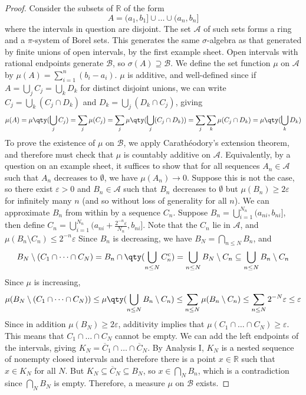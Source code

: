 \begin{proof}
	Consider the subsets of $\mathbb R$ of the form
	\[ A = (a_1,b_1] \cup \dots \cup (a_n,b_n] \]
	where the intervals in question are disjoint.
	The set $\mathcal A$ of such sets forms a ring and a $\pi$-system of Borel sets.
	This generates the same $\sigma$-algebra as that generated by finite unions of open intervals, by the first example sheet.
	Open intervals with rational endpoints generate $\mathcal B$, so $\sigma(A) \supseteq \mathcal B$.
	We define the set function $\mu$ on $\mathcal A$ by $\mu(A) = \sum_{i=1}^n (b_i - a_i)$.
	$\mu$ is additive, and well-defined since if $A = \bigcup_j C_j = \bigcup_k D_k$ for distinct disjoint unions, we can write $C_j = \bigcup_k (C_j \cap D_k)$ and $D_k = \bigcup_j (D_k \cap C_j)$, giving
	\[ \mu(A) = \mu\qty(\bigcup_j C_j) = \sum_j \mu(C_j) = \sum_j \mu\qty(\bigcup_j (C_j \cap D_k)) = \sum_j \sum_k \mu(C_j \cap D_k) = \mu\qty(\bigcup_k D_k) \]
	To prove the existence of $\mu$ on $\mathcal B$, we apply Carath\'eodory's extension theorem, and therefore must check that $\mu$ is countably additive on $\mathcal A$.
	Equivalently, by a question on an example sheet, it suffices to show that for all sequences $A_n \in \mathcal A$ such that $A_n$ decreases to $\emptyset$, we have $\mu(A_n) \to 0$.
	Suppose this is not the case, so there exist $\varepsilon > 0$ and $B_n \in \mathcal A$ such that $B_n$ decreases to $\emptyset$ but $\mu(B_n) \geq 2\varepsilon$ for infinitely many $n$ (and so without loss of generality for all $n$).
	We can approximate $B_n$ from within by a sequence $C_n$.
	Suppose $B_n = \bigcup_{i=1}^{N_n} (a_{ni},b_{ni}]$, then define $C_n = \bigcup_{i=1}^{N_n} (a_{ni}+\frac{2^{-n}\varepsilon}{N_n}, b_{ni}]$.
	Note that the $C_n$ lie in $\mathcal A$, and $\mu(B_n \setminus C_n) \leq 2^{-n}\varepsilon$
	Since $B_n$ is decreasing, we have $B_N = \bigcap_{n \leq N} B_n$, and
	\[ B_N \setminus (C_1 \cap \dots \cap C_N) = B_n \cap \qty(\bigcup_{n \leq N} C_n^c) = \bigcup_{n \leq N} B_N \setminus C_n \subseteq \bigcup_{n \leq N} B_n \setminus C_n \]
	Since $\mu$ is increasing,
	\[ \mu(B_N \setminus (C_1 \cap \dots \cap C_N)) \leq \mu\qty(\bigcup_{n \leq N} B_n \setminus C_n) \leq \sum_{n \leq N} \mu(B_n \setminus C_n) \leq \sum_{n \leq N} 2^{-N}\varepsilon \leq \varepsilon \]
	Since in addition $\mu(B_N) \geq 2\varepsilon$, additivity implies that $\mu(C_1 \cap \dots \cap C_N) \geq \varepsilon$.
	This means that $C_1 \cap \dots \cap C_N$ cannot be empty.
	We can add the left endpoints of the intervals, giving $K_N = \overline C_1 \cap \dots \cap \overline C_N$.
	By Analysis I, $K_N$ is a nested sequence of nonempty closed intervals and therefore there is a point $x \in \mathbb R$ such that $x \in K_N$ for all $N$.
	But $K_N \subseteq \overline C_N \subseteq B_N$, so $x \in \bigcap_N B_n$, which is a contradiction since $\bigcap_N B_N$ is empty.
	Therefore, a measure $\mu$ on $\mathcal B$ exists.


\end{proof}

